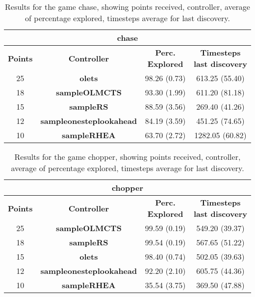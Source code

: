 \begin{table*}[!t]
\begin{center}
\begin{tabular}{|c|c|c|c|}
\multicolumn{4}{c}{\textbf{chase}}\\
\hline
\textbf{Points} & \textbf{Controller} & \textbf{Perc. Explored} &  \textbf{Timesteps last discovery}\\
\hline
25 & \textbf{olets} & 98.26 (0.73) & 613.25 (55.40)
 \\
\hline
18 & \textbf{sampleOLMCTS} & 93.30 (1.99) & 611.20 (81.18)
 \\
\hline
15 & \textbf{sampleRS} & 88.59 (3.56) & 269.40 (41.26)
 \\
\hline
12 & \textbf{sampleonesteplookahead} & 84.19 (3.59) & 451.25 (74.65)
 \\
\hline
10 & \textbf{sampleRHEA} & 63.70 (2.72) & 1282.05 (60.82)
 \\
\hline
\end{tabular}
\caption{Results for the game chase, showing points received, controller, average of percentage explored, timesteps average for last discovery.}
\label{tab:weights}
\end{center}
\end{table*}
\begin{table*}[!t]
\begin{center}
\begin{tabular}{|c|c|c|c|}
\multicolumn{4}{c}{\textbf{chopper}}\\
\hline
\textbf{Points} & \textbf{Controller} & \textbf{Perc. Explored} &  \textbf{Timesteps last discovery}\\
\hline
25 & \textbf{sampleOLMCTS} & 99.59 (0.19) & 549.20 (39.37)
 \\
\hline
18 & \textbf{sampleRS} & 99.54 (0.19) & 567.65 (51.22)
 \\
\hline
15 & \textbf{olets} & 98.40 (0.74) & 502.05 (39.63)
 \\
\hline
12 & \textbf{sampleonesteplookahead} & 92.20 (2.10) & 605.75 (44.36)
 \\
\hline
10 & \textbf{sampleRHEA} & 35.54 (3.75) & 369.50 (47.88)
 \\
\hline
\end{tabular}
\caption{Results for the game chopper, showing points received, controller, average of percentage explored, timesteps average for last discovery.}
\label{tab:weights}
\end{center}
\end{table*}
